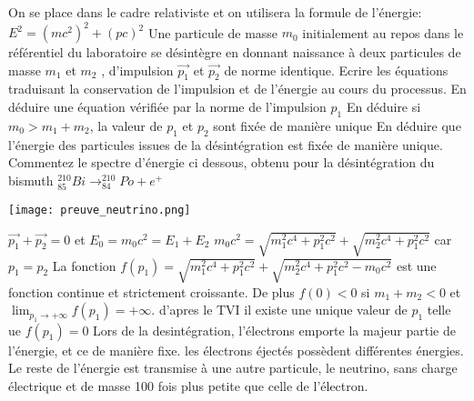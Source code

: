 \begin{Exercise}[title=Neutrino]
  On se place dans le cadre relativiste et on utilisera la formule de l'énergie:
  $E^2=(mc^2)^2+(pc)^2$
  Une particule de masse $m_0$ initialement au repos dans le référentiel du
  laboratoire se désintègre en donnant naissance à deux particules de masse $m_1$
  et $m_2$ , d'impulsion $\vec{p_1}$ et $\vec{p_2}$ de norme identique.
  \Question Ecrire les équations traduisant la conservation de l'impulsion et de
  l'énergie au cours du processus.
  \Question En déduire une équation vérifiée par la norme de l'impulsion $p_1$
  \Question En déduire si $m_0 > m_1+m_2$, la valeur de $p_1$ et $p_2$ sont fixée de
  manière unique
  \Question En déduire que l'énergie des particules issues de la désintégration
  est fixée de manière unique.
  \Question Commentez le spectre d'énergie ci dessous, obtenu pour la
  désintégration du bismuth $_{85}^{210}Bi \to_{84} ^{210}Po +e^+$
  \begin{center}
    \texttt{[image: preuve\_neutrino.png]}
  \end{center}
\end{Exercise}
\begin{Answer}
  \Question $\vec{p_1}+\vec{p_2}=0$ et $E_0=m_0c^2=E_1+E_2$
  \Question $m_0c^2=\sqrt{m_1^2c^4+p_1^2c^2}+\sqrt{m_2^2c^4+p_1^2c^2}$ car $p_1=p_2$
  \Question La fonction $f(p_1)=\sqrt{m_1^2c^4+p_1^2c^2}+\sqrt{m_2^2c^4+p_1^2c^2-m_0c^2}$ est
  une fonction continue et strictement croissante. De plus $f(0)<0$ si
  $m_1+m_2<0$ et $\lim_{p_1\to+\infty}{f(p_1)=+\infty}$. d'apres le TVI il existe une unique
  valeur de $p_1$ telle ue $f(p_1)=0$
  \Question Lors de la desintégration, l'électrons emporte la majeur partie de
  l'énergie, et ce de manière fixe. les électrons éjectés  possèdent différentes
  énergies. Le reste de l'énergie est transmise à une autre particule, le
  neutrino, sans charge électrique et  de masse 100 fois plus petite que celle
  de l'électron.
\end{Answer}

